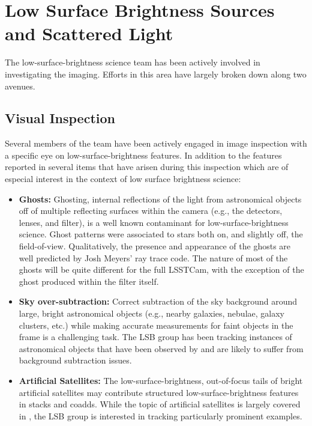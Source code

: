 \section{Low Surface Brightness Sources and Scattered Light}
\label{sec:low_surface_brightness}

The low-surface-brightness science team has been actively involved in investigating the \ComCam imaging. Efforts in this area have largely broken down along two avenues.

\subsection{Visual Inspection}

Several members of the team have been actively engaged in image inspection with a specific eye on
low-surface-brightness features.
In addition to the features reported in 
several items that have arisen during this inspection which are of especial interest in the
context of low surface brightness science:

\begin{itemize}
\item {\bf Ghosts:} Ghosting, internal reflections of the light from astronomical objects off of multiple
  reflecting surfaces within the camera (e.g., the detectors, lenses, and filter), is a well known contaminant
  for low-surface-brightness science. Ghost patterns were associated to stars both on, and slightly off, the
  \ComCam field-of-view.
   Qualitatively, the presence and appearance of 
  the ghosts are well predicted by Josh Meyers' \Batoid ray trace code.
  The nature of most of the ghosts will be
  quite different for the full LSSTCam, with the exception of the ghost produced
  within the filter itself.

\item {\bf Sky over-subtraction:} Correct subtraction of the sky background around large, bright astronomical
  objects (e.g., nearby galaxies, nebulae, galaxy clusters, etc.) while making accurate measurements for faint
  objects in the frame is a challenging task. The LSB group has been tracking instances of astronomical objects that have been observed by \ComCam and are likely to suffer from background subtraction issues.

\item {\bf Artificial Satellites:} The low-surface-brightness, out-of-focus tails of bright artificial satellites may contribute structured low-surface-brightness features in stacks and coadds. While the topic of artificial satellites is largely covered in , the LSB group is interested in tracking particularly prominent examples.

\end{itemize}

